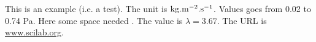 This is an example (i.e. a test).
The unit is $\rm kg.m^{-2}.s^{-1}$.
Values goes from 0.02 to 0.74 Pa.
Here some space needed \hspace{0.5cm}.
The value is $\lambda=3.67$.
The URL is \url{www.scilab.org}.
